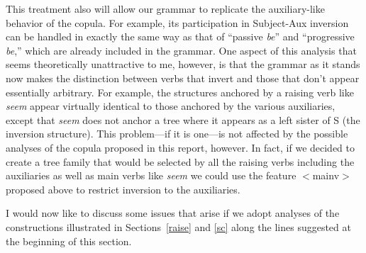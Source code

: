 This treatment also will allow our grammar to replicate the
auxiliary-like behavior of the copula. For example, its participation in
Subject-Aux inversion can be handled in exactly the same way as that of
``passive {\em be\/}'' and ``progressive {\em be\/},'' which are already
included in the grammar.  One aspect of this analysis that seems
theoretically unattractive to me, however, is that the grammar as it
stands now makes the distinction between verbs that invert and those
that don't appear essentially arbitrary. For example, the structures
anchored by a raising verb like {\em seem} appear virtually identical to
those anchored by the various auxiliaries, except that {\em seem} does
not anchor a tree where it appears as a left sister of S (the inversion
structure).  This problem---if it is one---is not affected by the
possible analyses of the copula proposed in this report, however. In
fact, if we decided to create a tree family that would be selected by
all the raising verbs including the auxiliaries as well as main verbs
like {\em seem\/} we could use the feature $<$mainv$>$ proposed above to
restrict inversion to the auxiliaries.


I would now like to discuss some issues that arise if we adopt analyses
of the constructions illustrated in Sections~\ref{raise} and \ref{sc}
along the lines suggested at the beginning of this section.

